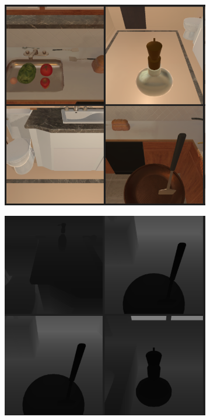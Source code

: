 \documentclass[11pt,a4paper]{article}
\begin{document}
\begin{figure}
     \centering
     \begin{subfigure}[b]{0.32\textwidth}
         \centering
         \includegraphics[width=\textwidth]{figures/rgb.png}
         \caption{}
     \end{subfigure}
     \hfill
     \begin{subfigure}[b]{0.32\textwidth}
         \centering
         \includegraphics[width=\textwidth]{figures/depth.png}

\end{subfigure}
\end{figure}
\end{document}
